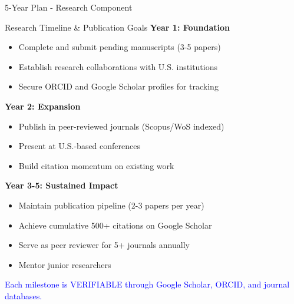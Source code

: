 \documentclass[11pt]{beamer}
\begin{document}
	\begin{frame}{5-Year Plan - Research Component}
		\scriptsize
		\begin{block}{Research Timeline \& Publication Goals}
			\textbf{Year 1: Foundation}
			\begin{itemize}
				\item Complete and submit pending manuscripts (3-5 papers)
				\item Establish research collaborations with U.S. institutions
				\item Secure ORCID and Google Scholar profiles for tracking
			\end{itemize}
			\textbf{Year 2: Expansion}
			\begin{itemize}
				\item Publish in peer-reviewed journals (Scopus/WoS indexed)
				\item Present at U.S.-based conferences
				\item Build citation momentum on existing work
			\end{itemize}
			\textbf{Year 3-5: Sustained Impact}
			\begin{itemize}
				\item Maintain publication pipeline (2-3 papers per year)
				\item Achieve cumulative 500+ citations on Google Scholar
				\item Serve as peer reviewer for 5+ journals annually
				\item Mentor junior researchers
			\end{itemize}
			\textcolor{blue}{Each milestone is VERIFIABLE through Google Scholar, ORCID, and journal databases.}
		\end{block}
	\end{frame}
	
\end{document}
